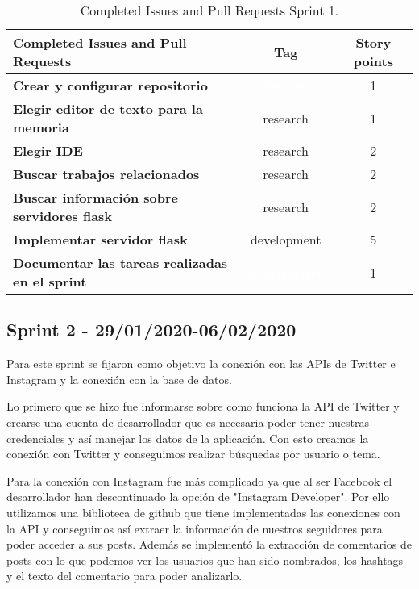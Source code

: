 \begin{table}[ht!]
    \centering
    \resizebox{15cm}{!} {
    \begin{tabular}{|l|c|c|}
    \hline
    \rowcolor[rgb]{0.81,0.81,0.77}
    \textbf{Completed Issues and Pull Requests}     &\textbf{Tag}     & \textbf{Story points} \\ \hline
    \textbf{Crear y configurar repositorio}         &\cellcolor[rgb]{0.93,0.35,0.0}\textcolor{white}{configuration}      &1 \\ \hline 
    \textbf{Elegir editor de texto para la memoria}         &\cellcolor[rgb]{0.6,1.0,0.6}research      &1 \\ \hline
    \textbf{Elegir IDE}         &\cellcolor[rgb]{0.6,1.0,0.6}research      &2 \\ \hline 
    \textbf{Buscar trabajos relacionados}         &\cellcolor[rgb]{0.6,1.0,0.6}research      &2 \\ \hline 
    \textbf{Buscar información sobre servidores flask}         &\cellcolor[rgb]{0.6,1.0,0.6}research      &2 \\ \hline 
    \textbf{Implementar servidor flask}         &\cellcolor[rgb]{0.69,0.93,0.93}development      &5 \\ \hline 
    \textbf{Documentar las tareas realizadas en el sprint}         &\cellcolor[rgb]{0.0,0.33,0.71}\textcolor{white}{documentation}      &1 \\ \hline 
    \end{tabular}}
    \caption{Completed Issues and Pull Requests Sprint 1.}
    \label{tab:my_label}
\end{table}

\subsection{Sprint 2 - 29/01/2020-06/02/2020}
Para este sprint se fijaron como objetivo la conexión con las APIs de Twitter e Instagram y la conexión con la base de datos.

Lo primero que se hizo fue informarse sobre como funciona la API de Twitter y crearse una cuenta de desarrollador que es necesaria poder tener nuestras credenciales y así manejar los datos de la aplicación.
Con esto creamos la conexión con Twitter y conseguimos realizar búsquedas por usuario o tema.

Para la conexión con  Instagram fue más complicado ya que al ser Facebook el desarrollador han descontinuado la opción de "Instagram Developer". Por ello utilizamos una biblioteca de github que tiene implementadas las conexiones con la API y conseguimos así extraer la información de nuestros seguidores para poder acceder a sus posts. Además se implementó la extracción de comentarios de posts con lo que podemos ver los usuarios que han sido nombrados, los hashtags y el texto del comentario para poder analizarlo.

